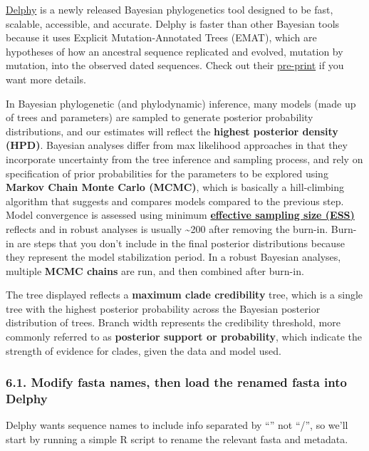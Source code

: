 \documentclass[
]{book}
\begin{document}
\href{https://delphy.fathom.info/}{Delphy} is a newly released Bayesian phylogenetics tool designed to be fast, scalable, accessible, and accurate. Delphy is faster than other Bayesian tools because it uses Explicit Mutation-Annotated Trees (EMAT), which are hypotheses of how an ancestral sequence replicated and evolved, mutation by mutation, into the observed dated sequences. Check out their \href{https://www.biorxiv.org/content/10.1101/2025.03.25.645253v1.full.pdf}{pre-print} if you want more details.

In Bayesian phylogenetic (and phylodynamic) inference, many models (made up of trees and parameters) are sampled to generate posterior probability distributions, and our estimates will reflect the \textbf{highest posterior density (HPD)}. Bayesian analyses differ from max likelihood approaches in that they incorporate uncertainty from the tree inference and sampling process, and rely on specification of prior probabilities for the parameters to be explored using \textbf{Markov Chain Monte Carlo (MCMC)}, which is basically a hill-climbing algorithm that suggests and compares models compared to the previous step. Model convergence is assessed using minimum \href{https://github.com/fathominfo/delphy-web/wiki/Effective-Sample-Size}{\textbf{effective sampling size (ESS)}} reflects and in robust analyses is usually \textasciitilde200 after removing the burn-in. Burn-in are steps that you don't include in the final posterior distributions because they represent the model stabilization period. In a robust Bayesian analyses, multiple \textbf{MCMC chains} are run, and then combined after burn-in.

The tree displayed reflects a \textbf{maximum clade credibility} tree, which is a single tree with the highest posterior probability across the Bayesian posterior distribution of trees. Branch width represents the credibility threshold, more commonly referred to as \textbf{posterior support or probability}, which indicate the strength of evidence for clades, given the data and model used.

\subsubsection{6.1. Modify fasta names, then load the renamed fasta into Delphy}\label{modify-fasta-names-then-load-the-renamed-fasta-into-delphy}

Delphy wants sequence names to include info separated by ``\textbar{}'' not ``/'', so we'll start by running a simple R script to rename the relevant fasta and metadata.
\end{document}
